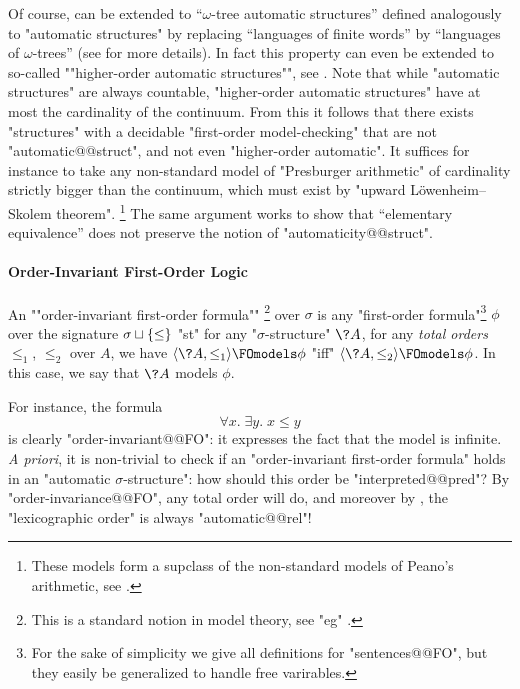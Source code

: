 Of course,  can be extended
to ``$\omega$-tree automatic structures'' defined analogously to "automatic structures" by
replacing ``languages of finite words'' by ``languages of $\omega$-trees''
(see \cite[\S~XII]{Blumensath2024MSOModelTheory} for more details).
In fact this property can even be extended to so-called
\AP""higher-order automatic structures"", see
\cite[last remark of \S~XII.2]{Blumensath2024MSOModelTheory}.
Note that while "automatic structures" are always countable,
"higher-order automatic structures" have at most the cardinality of the continuum.%
From this it follows that there exists "structures" with a decidable "first-order model-checking" that are not "automatic@@struct", and not even "higher-order automatic".
It suffices for instance to take any non-standard model of "Presburger arithmetic"
of cardinality strictly bigger than the continuum, which must exist by
"upward Löwenheim–Skolem theorem".%
\footnote{These models form a supclass of the non-standard models of Peano's arithmetic,
see \cite[Ex.~2, p.~36 \& \S~11.4]{Hodges1993ModelTheory}.}
The same argument works to show that ``elementary equivalence''
does not preserve the notion of "automaticity@@struct".

\paragraph*{Order-Invariant First-Order Logic}
An \AP""order-invariant first-order formula""%
\footnote{This is a standard notion in model theory, see "eg"
\cite[Exercise~3.1.12]{Gradel2007FiniteModelTheory}.}
over $\sigma$
is any "first-order formula"\footnote{For the sake of simplicity we give all definitions
for "sentences@@FO", but they easily be generalized to handle free varirables.} $\phi$
over the signature $\sigma \sqcup \{\leq\}$ "st" for any
"$\sigma$-structure" $\?A$, for any \emph{total orders} $\leq_1$, $\leq_2$ over $A$,
we have $\tup{\?A, \leq_1} \FOmodels \phi$ "iff" $\tup{\?A, \leq_2} \FOmodels \phi$.
In this case, we say that $\?A$ models $\phi$.

For instance, the formula
\[
	\forall x.\; \exists y.\; x \leq y
\]
is clearly "order-invariant@@FO": it expresses the fact that the model is infinite.
\emph{A priori}, it is non-trivial to check if an "order-invariant first-order formula" holds in an
"automatic $\sigma$-structure": how should this order be "interpreted@@pred"?
By "order-invariance@@FO", any total order will do, and moreover by
, the "lexicographic order" is always "automatic@@rel"!

